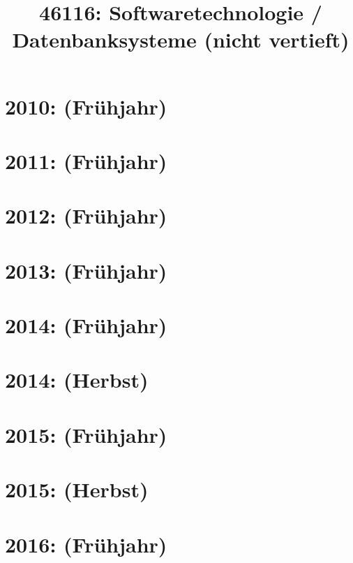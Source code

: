 \documentclass{lehramt-informatik-haupt}
\title{46116: Softwaretechnologie / Datenbanksysteme (nicht vertieft)}
\begin{document}
\maketitle
\tableofcontents

\section{2010: (Frühjahr)}


\section{2011: (Frühjahr)}


\section{2012: (Frühjahr)}


\section{2013: (Frühjahr)}


\section{2014: (Frühjahr)}


\section{2014: (Herbst)}


\section{2015: (Frühjahr)}


\section{2015: (Herbst)}


\section{2016: (Frühjahr)}

\end{document}

